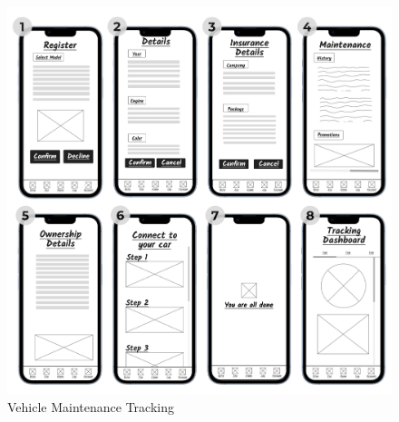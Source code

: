 \documentclass[12pt,a4paper]{article}
\begin{document}
\begin{figure}[h]
    \centering
    \includegraphics[width=0.8
    \textwidth]{images/Prototype Figures/Prototype Figure 7.png}
    \caption{Vehicle Maintenance Tracking}
    \label{fig:example}
\end{figure}
\end{document}
